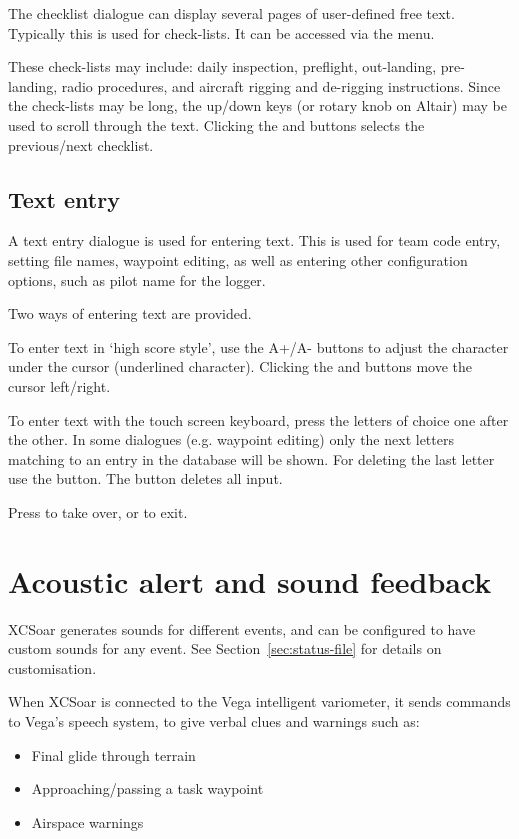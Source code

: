 The checklist dialogue can display several pages of user-defined free text.
Typically this is used for check-lists. It can be accessed via the menu.

\blink{}

These check-lists may include: daily inspection, preflight, out-landing,
pre-landing, radio procedures, and aircraft rigging and de-rigging
instructions.  Since the check-lists may be long, the up/down keys (or rotary
knob on Altair) may be used to scroll through the text. Clicking the
\bmenuw{$<$} and \bmenuw{$>$} buttons selects the previous/next checklist.


\subsection*{Text entry} \label{sec:textentry}

A text entry dialogue is used for entering text.  This is used for team
code entry, setting file names, waypoint editing, as well as entering
other configuration options, such as pilot name for the logger.

Two ways of entering text are provided. 

To enter text in `high score style', use the A+/A- buttons to adjust the 
character under the cursor (underlined character). Clicking the \button{$<$} 
and \button{$>$} buttons move the cursor left/right.  

To enter text with the touch screen keyboard, press the letters of choice 
one after the other. In some dialogues (e.g. waypoint editing) only the next 
letters matching to an entry in the database will be shown. For deleting the 
last letter use the \button{$<-$} button. The  button deletes all input.

Press  to take over, or  to exit.


\section{Acoustic alert and sound feedback}

XCSoar generates sounds for different events, and can be configured to
have custom sounds for any event.  See Section~\ref{sec:status-file} for
details on customisation.

When XCSoar is connected to the Vega intelligent variometer, it sends
commands to Vega's speech system, to give verbal clues and warnings such as:
\begin{itemize}
\item Final glide through terrain
\item Approaching/passing a task waypoint
\item Airspace warnings
\end{itemize}

